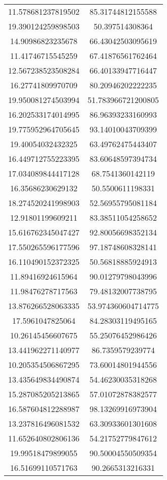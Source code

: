 \begin{table}
\begin{tabular}{cc}
11.578681237819502 & 85.31744812155588 \\
19.390124259898503 & 50.397514308364 \\
14.90986823235678 & 66.43042503095619 \\
11.41746715545259 & 67.41876561762464 \\
12.567238523508284 & 66.40133947716447 \\
16.27741809970709 & 80.20946202222235 \\
19.950081274503994 & 51.783966721200805 \\
16.202533174014995 & 86.96393233160993 \\
19.775952964705645 & 93.14010043709399 \\
19.40054032432325 & 63.49762475443407 \\
16.449712755223395 & 83.60648597394734 \\
17.034089844417128 & 68.7541360142119 \\
16.35686230629132 & 50.5500611198331 \\
18.274520241998903 & 52.56955795081184 \\
12.91801199609211 & 83.38511054258652 \\
15.616762345047427 & 92.80056698352134 \\
17.550265596177596 & 97.18748608328141 \\
16.110490152372325 & 50.56818885924913 \\
11.89416924615964 & 90.01279798043996 \\
11.98476278717563 & 79.48132007738795 \\
13.876266528063335 & 53.974360604714775 \\
17.5961047825064 & 84.28303119495165 \\
10.26145456607675 & 55.25076452986426 \\
13.441962271140977 & 86.7359579239774 \\
10.205354506867295 & 73.60014801944556 \\
13.435649834490874 & 54.46230035318268 \\
15.287085205213865 & 57.01072878382577 \\
16.587604812288987 & 98.13269916973904 \\
13.237816496081532 & 63.30933601301608 \\
11.652640802806136 & 54.21752779847612 \\
19.99518479899055 & 90.50004550509354 \\
16.51699110571763 & 90.2665313216331 \\

\end{tabular}
\end{table}
